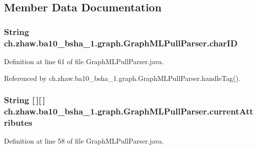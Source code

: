 \subsection{Member Data Documentation}
\hypertarget{classch_1_1zhaw_1_1ba10__bsha__1_1_1graph_1_1GraphMLPullParser_adf4343a0781e9f30755d78eb8d821d90}{
\subsubsection[{charID}]{\setlength{\rightskip}{0pt plus 5cm}String {\bf ch.zhaw.ba10\_\-bsha\_\-1.graph.GraphMLPullParser.charID}}}
\label{classch_1_1zhaw_1_1ba10__bsha__1_1_1graph_1_1GraphMLPullParser_adf4343a0781e9f30755d78eb8d821d90}


Definition at line 61 of file GraphMLPullParser.java.

Referenced by ch.zhaw.ba10\_\-bsha\_\-1.graph.GraphMLPullParser.handleTag().\hypertarget{classch_1_1zhaw_1_1ba10__bsha__1_1_1graph_1_1GraphMLPullParser_ae37f614d6cb7f6ad309e1f6b138f041b}{
\subsubsection[{currentAttributes}]{\setlength{\rightskip}{0pt plus 5cm}String \mbox{[}$\,$\mbox{]}\mbox{[}$\,$\mbox{]} {\bf ch.zhaw.ba10\_\-bsha\_\-1.graph.GraphMLPullParser.currentAttributes}}}
\label{classch_1_1zhaw_1_1ba10__bsha__1_1_1graph_1_1GraphMLPullParser_ae37f614d6cb7f6ad309e1f6b138f041b}


Definition at line 58 of file GraphMLPullParser.java.

